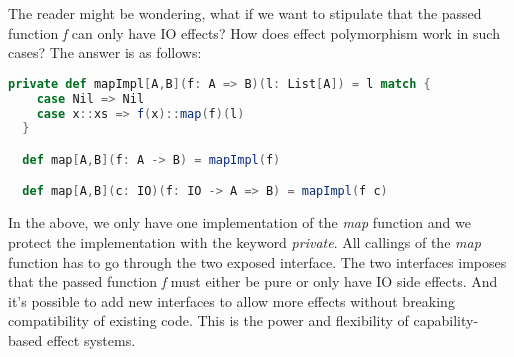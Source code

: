 The reader might be wondering, what if we want to stipulate that the
passed function \emph{f} can only have IO effects? How does effect
polymorphism work in such cases? The answer is as follows:

\begin{lstlisting}[language=Scala]
  private def mapImpl[A,B](f: A => B)(l: List[A]) = l match {
    case Nil => Nil
    case x::xs => f(x)::map(f)(l)
  }

  def map[A,B](f: A -> B) = mapImpl(f)

  def map[A,B](c: IO)(f: IO -> A => B) = mapImpl(f c)
\end{lstlisting}

In the above, we only have one implementation of the \emph{map}
function and we protect the implementation with the keyword
\emph{private}. All callings of the \emph{map} function has to go
through the two exposed interface. The two interfaces imposes that the
passed function \emph{f} must either be pure or only have IO side
effects. And it's possible to add new interfaces to allow more effects
without breaking compatibility of existing code. This is the power and
flexibility of capability-based effect systems.
